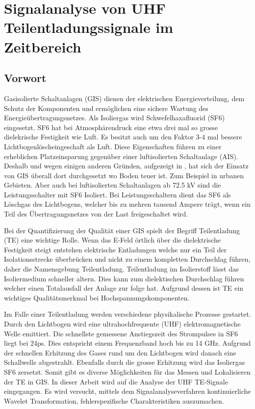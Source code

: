 %
%
%
\chapter{Signalanalyse von UHF Teilentladungssignale im Zeitbereich \label{chapter:gis}}
\begin{refsection}

\section{Vorwort}

Gasisolierte Schaltanlagen (GIS) dienen der elektrischen Energieverteilung, dem Schutz der Komponenten und ermöglichen eine sichere Wartung des Energieübertragungsnetzes.
Als Isoliergas wird Schwefelhaxafluorid (SF6) eingesetzt. SF6 hat bei Atmosphärendruck eine etwa drei mal so grosse dielekrische Festigkeit wie Luft. 
Es besitzt auch um den Faktor 3-4 mal bessere Lichtbogenlöscheingeschaft als Luft. 
Diese Eigenschaften führen zu einer erheblichen Platzeinsparung gegenüber einer luftisolierten Schaltanlage (AIS). \cite{buch:ABB}
Deshalb und wegen einigen anderen Gründen, aufgezeigt in \cite{buch:GIS/AIS}, hat sich der Einsatz von GIS überall dort durchgesetzt wo Boden teuer ist. Zum Beispiel in urbanen Gebieten. Aber auch bei luftisolierten Schaltanlagen ab 72.5 kV sind die Leistungsschalter mit SF6 Isoliert. 
Bei Leistungsschaltern dient das SF6 als Löschgas des Lichtbogens, welcher bis zu mehren tausend Ampere trägt, wenn ein Teil des Übertragungsnetzes von der Last freigeschaltet wird. \cite{buch:ABB} 

Bei der Quantifizierung der Qualität einer GIS spielt der Begriff Teilentladung (TE) eine wichtige Rolle. 
Wenn das E-Feld örtlich über die dielektrische Festigkeit steigt entstehen elektrische Entladungen welche nur ein Teil der Isolationsstrecke überbrücken und nicht zu einem kompletten Durchschlag führen, daher die Namensgebung Teilentladung. \cite{buch:Küchler}
Teilentladung im Isolierstoff lässt das Isoliermedium  schneller altern. Dies kann zum dielektischen Durchschlag führen welcher einen Totalausfall der Anlage zur folge hat.
Aufgrund dessen ist TE ein wichtiges Qualitätsmerkmal bei Hochspannungskomponenten. 

Im Falle einer Teilentladung werden verschiedene  physikalische Prozesse gestartet. 
Durch den Lichtbogen wird eine ultrahochfrequente (UHF) elektromagnetische Welle emittiert.
Die schnellste gemessene Anstiegszeit des Strompulses in SF6 liegt bei 24ps.
Dies entspricht einem Frequenzband hoch bis zu 14 GHz. \cite{skript:Judd24ps} 
Aufgrund der schnellen Erhitzung des Gases rund um den Lichtbogen wird danach eine Schallwelle abgestrahlt. 
Ebenfalls durch die grosse Erhitzung wird das Isoliergas SF6 zersetzt. 
Somit gibt es diverse Möglichkeiten für das Messen und Lokalisieren der TE in GIS. \cite{skript:StatusReviewPDMeasurement}
In dieser Arbeit wird auf die Analyse der UHF TE-Signale eingegangen. Es wird versucht, mittels dem Signalanalyseverfahren kontinuierliche Wavelet Transformation, fehlerspezifische Charakteristiken auszumachen.


\end{refsection}
